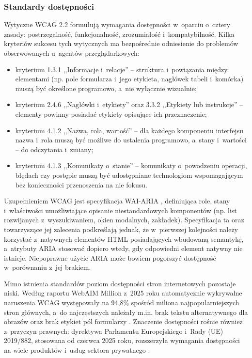 \subsubsection{Standardy dostępności}
Wytyczne WCAG 2.2 \citep{w3c2023wcag22} formułują wymagania dostępności w~oparciu o~cztery zasady: postrzegalność, funkcjonalność, zrozumiałość i~kompatybilność. Kilka kryteriów sukcesu tych wytycznych ma bezpośrednie odniesienie do problemów obserwowanych u~agentów przeglądarkowych:
\begin{itemize}
    \item kryterium 1.3.1 ,,Informacje i~relacje'' -- struktura i~powiązania między elementami (np. pole formularza i~jego etykieta, nagłówek tabeli i~komórka) muszą być określone programowo, a~nie wyłącznie wizualnie;
    \item kryterium 2.4.6 ,,Nagłówki i~etykiety'' oraz 3.3.2 ,,Etykiety lub instrukcje'' -- elementy powinny posiadać etykiety opisujące ich przeznaczenie;
    \item kryterium 4.1.2 ,,Nazwa, rola, wartość'' -- dla każdego komponentu interfejsu nazwa i~rola muszą być możliwe do ustalenia programowo, a~stany i~wartości -- do odczytania i~zmiany;
    \item kryterium 4.1.3 ,,Komunikaty o~stanie'' -- komunikaty o~powodzeniu operacji, błędach czy postępie muszą być udostępniane technologiom wspomagającym bez konieczności przenoszenia na nie fokusu.
\end{itemize}

Uzupełnieniem WCAG jest specyfikacja WAI-ARIA \citep{w3c2023aria12}, definiująca role, stany i~właściwości umożliwiające opisanie niestandardowych komponentów (np. list rozwijanych z~wyszukiwaniem, okien modalnych, zakładek). Specyfikacja ta oraz towarzyszące jej zalecenia podkreślają jednak, że w~pierwszej kolejności należy korzystać z~natywnych elementów HTML posiadających wbudowaną semantykę, a~atrybuty ARIA stosować dopiero wtedy, gdy odpowiedni element natywny nie istnieje. Niepoprawne użycie ARIA może bowiem pogorszyć dostępność w~porównaniu z~jej brakiem.

Mimo istnienia standardów poziom dostępności stron internetowych pozostaje niski. Według raportu WebAIM Million z~2025 roku automatycznie wykrywalne naruszenia WCAG występowały na 94,8\% spośród miliona najpopularniejszych stron głównych, a~do najczęstszych należały m.in. brak tekstu alternatywnego dla obrazów oraz brak etykiet pól formularzy \citep{webaim2025million}. Znaczenie dostępności rośnie również z~przyczyn prawnych: dyrektywa Parlamentu Europejskiego i~Rady (UE) 2019/882, stosowana od czerwca 2025 roku, rozszerzyła wymagania dostępności na wiele produktów i~usług sektora prywatnego \citep{ue2019eaa}.

